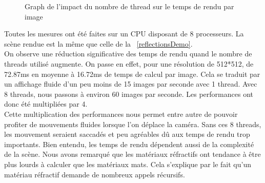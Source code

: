 \documentclass[11pt]{article}
\begin{document}
\begin{figure}[h!]
	
	\caption{Graph de l'impact du nombre de thread sur le temps de rendu par image}
	\label{graphMultithreading}
\end{figure}
\FloatBarrier
Toutes les mesures ont été faites sur un CPU disposant de 8 processeurs. La scène rendue est la même que celle de la \figurename\ \ref{reflectionsDemo}.\\
On observe une réduction significative des temps de rendu quand le nombre de threads utilisé augmente. On passe en effet, pour une résolution de 512*512, de 72.87ms en moyenne à 16.72ms de temps de calcul par image. Cela se traduit par un affichage fluide d'un peu moins de 15 images par seconde avec 1 thread. Avec 8 threads, nous passons à environ 60 images par seconde. Les performances ont donc été multipliées par 4.\\
Cette multiplication des performances nous permet entre autre de pouvoir profiter de mouvements fluides lorsque l'on déplace la caméra. Sans ces 8 threads, les mouvement seraient saccadés et peu agréables dû aux temps de rendu trop importants. Bien entendu, les temps de rendu dépendent aussi de la complexité de la scène. Nous avons remarqué que les matériaux réfractifs ont tendance à être plus lourds à calculer que les matériaux mats. Cela s'explique par le fait qu'un matériau réfractif demande de nombreux appels récursifs.
\end{document}
